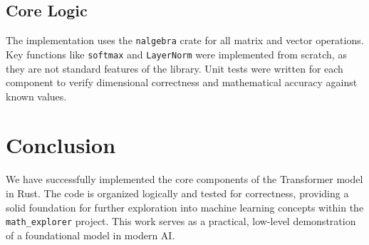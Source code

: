 \documentclass{article}
\begin{document}
\subsection{Core Logic}
The implementation uses the \texttt{nalgebra} crate for all matrix and vector operations. Key functions like \texttt{softmax} and \texttt{LayerNorm} were implemented from scratch, as they are not standard features of the library. Unit tests were written for each component to verify dimensional correctness and mathematical accuracy against known values.

\section{Conclusion}
We have successfully implemented the core components of the Transformer model in Rust. The code is organized logically and tested for correctness, providing a solid foundation for further exploration into machine learning concepts within the \texttt{math_explorer} project. This work serves as a practical, low-level demonstration of a foundational model in modern AI.



\end{document}
